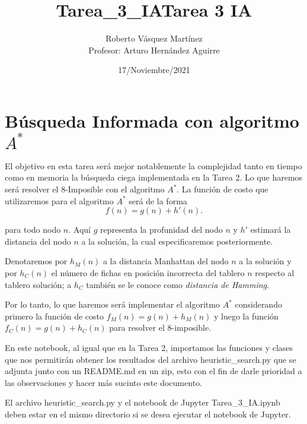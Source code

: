\documentclass[11pt]{article}
\title{Tarea\_3\_IA}
\begin{document}
    \title{Tarea 3 IA}
    \author{Roberto Vásquez Martínez \\ Profesor: Arturo Hernández Aguirre}
    \date{17/Noviembre/2021}
    \maketitle
    
    \hypertarget{buxfasqueda-informada-con-algoritmo-a}{%
\section{\texorpdfstring{Búsqueda Informada con algoritmo
\(A^*\)}{Búsqueda Informada con algoritmo A\^{}*}}\label{buxfasqueda-informada-con-algoritmo-a}}

    El objetivo en esta tarea será mejor notablemente la complejidad tanto
en tiempo como en memoria la búsqueda ciega implementada en la Tarea 2.
Lo que haremos será resolver el 8-Imposible con el algoritmo \(A^*\). La
función de costo que utilizaremos para el algoritmo \(A^*\) será de la
forma \begin{equation*}
f(n)=g(n)+h'(n).
\end{equation*}

    para todo nodo \(n\). Aquí \(g\) representa la profunidad del nodo \(n\)
y \(h'\) estimará la distancia del nodo \(n\) a la solución, la cual
especificaremos posteriormente.

Denotaremos por \(h_M(n)\) a la distancia Manhattan del nodo \(n\) a la
solución y por \(h_C(n)\) el número de fichas en posición incorrecta del
tablero \(n\) respecto al tablero solución; a \(h_C\) también se le
conoce como \emph{distancia de Hamming}.

    Por lo tanto, lo que haremos será implementar el algoritmo \(A^*\)
considerando primero la función de costo \(f_M(n)=g(n)+h_M(n)\) y luego
la función \(f_C(n)=g(n)+h_C(n)\) para resolver el 8-imposible.

    En este notebook, al igual que en la Tarea 2, importamos las funciones y
clases que nos permitirán obtener los resultados del archivo
\textsf{heuristic\_search.py} que se adjunta junto con un \textsf{README.md}
en un zip, esto con el fin de darle prioridad a las observaciones y
hacer más sucinto este documento.

El archivo \textsf{heuristic\_search.py} y el notebook de Jupyter
\textsf{Tarea\_3\_IA.ipynb} deben estar en el mismo directorio si se desea ejecutar el notebook de Jupyter.
\end{document}
